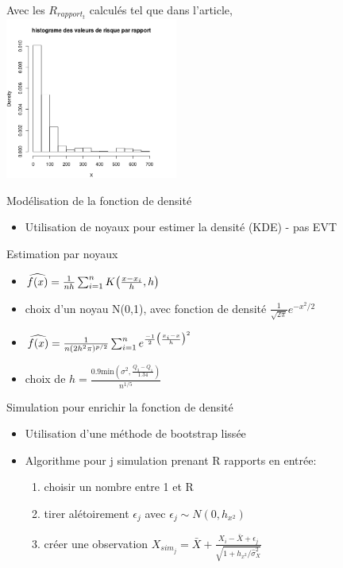 \begin{frame}[t]
	Avec les $R_{rapport_t}$ calculés tel que dans l'article, \\
	\includegraphics[height=200px] {histogramme_par_rapport}
	
\end{frame}


\begin{frame}[t]
	
	Modélisation de la fonction de densité
	\begin{itemize}
	\item Utilisation de noyaux pour estimer la densité (KDE) - pas EVT
\end{itemize}

Estimation par noyaux 

\begin{itemize}
	\item $\widehat{f(x)} = \frac{1}{nh} \sum^{n}_{i=1}K\big{(} \frac{x-x_i}{h},h \big{)}$
	\item choix d'un noyau N(0,1), avec fonction de densité $\frac{1}{\sqrt{2\pi}}e^{-x^2/2}$
	\item $\widehat{f(x)} = \frac{1}{n(2h^2\pi)^{p/2}}\sum^{n}_{i=1}e^{\frac{-1}{2}\big{(}\frac{x_{i}-x}{h}\big{)}^2}$
	\item choix de $h = \frac{0.9 \textrm{min}(\sigma^2, \frac{Q_3-Q_1}{1.34})}{n^{1/5}}$
\end{itemize}


Simulation pour enrichir la fonction de densité

\begin{itemize}
	\item Utilisation d'une méthode de bootstrap lissée
	\item Algorithme pour j simulation prenant R rapports en entrée:
		\begin{enumerate}		
		\item choisir un nombre entre 1 et R 
		\item tirer alétoirement $\epsilon_j$ avec $\epsilon_j \sim N(0,h_{x^2})$ 		
		\item créer une observation $X_{sim_j} = \bar{X} + \frac{X_i - \bar{X} + \epsilon_j}{\sqrt{1+h_{x^2}/\hat{\sigma}^2_X}} 	$
		\end{enumerate}
	
\end{itemize}

\end{frame}




